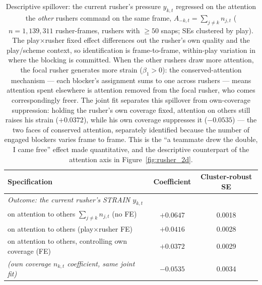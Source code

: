 \begin{table}[h!]
\centering
\footnotesize
\begin{tabular}{lcc}
\toprule
Specification & Coefficient & Cluster-robust SE \\
\midrule
\multicolumn{3}{l}{\emph{Outcome: the current rusher's STRAIN $y_{k,t}$}} \\
\quad on attention to others $\sum_{j\neq k} n_{j,t}$ (no FE) & $+0.0647$ & 0.0018 \\
\quad on attention to others (play$\times$rusher FE) & $+0.0416$ & 0.0028 \\
\quad on attention to others, controlling own coverage (FE) & $+0.0372$ & 0.0029 \\
\quad \emph{(own coverage $n_{k,t}$ coefficient, same joint fit)} & $-0.0535$ & 0.0034 \\
\bottomrule
\end{tabular}
\caption{Descriptive spillover: the current rusher's pressure $y_{k,t}$ regressed on the attention
the \emph{other} rushers command on the same frame, $A_{-k,t}=\sum_{j\neq k} n_{j,t}$
($n=1,139,311$ rusher-frames, rushers with $\geq50$ snaps; SEs clustered by play). The
play$\times$rusher fixed effect differences out the rusher's own quality and the play/scheme context,
so identification is frame-to-frame, within-play variation in where the blocking is committed. When
the other rushers draw more attention, the focal rusher generates more strain ($\beta_1>0$): the
conserved-attention mechanism --- each blocker's assignment sums to one across rushers --- means
attention spent elsewhere is attention removed from the focal rusher, who comes correspondingly
freer. The joint fit separates this spillover from own-coverage suppression: holding the rusher's own
coverage fixed, attention on others still raises his strain ($+0.0372$), while his own
coverage suppresses it ($-0.0535$) --- the two faces of conserved attention, separately
identified because the number of engaged blockers varies frame to frame. This is the ``a teammate drew
the double, I came free'' effect made quantitative, and the descriptive counterpart of the attention
axis in Figure~\ref{fig:rusher_2d}.}
\label{tab:spillover}
\end{table}
